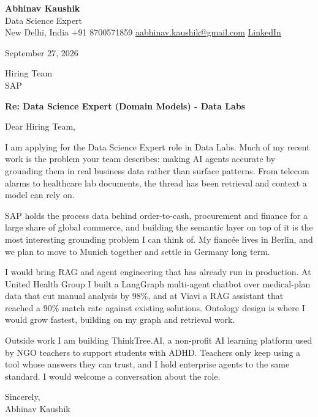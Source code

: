 \documentclass[11pt,a4paper]{article}
\begin{document}
{\Large\bfseries Abhinav Kaushik}\\
Data Science Expert\\
New Delhi, India \textbar{} +91 8700571859 \textbar{} \href{mailto:aabhinav.kaushik@gmail.com}{aabhinav.kaushik@gmail.com} \textbar{} \href{https://www.linkedin.com/in/abhinav-kaushik10/}{LinkedIn}  

September 27, 2026

Hiring Team\\
SAP

\textbf{Re: Data Science Expert (Domain Models) - Data Labs}

Dear Hiring Team,

I am applying for the Data Science Expert role in Data Labs. Much of my recent work is the problem your team describes: making AI agents accurate by grounding them in real business data rather than surface patterns. From telecom alarms to healthcare lab documents, the thread has been retrieval and context a model can rely on.

SAP holds the process data behind order-to-cash, procurement and finance for a large share of global commerce, and building the semantic layer on top of it is the most interesting grounding problem I can think of. My fiancée lives in Berlin, and we plan to move to Munich together and settle in Germany long term.

I would bring RAG and agent engineering that has already run in production. At United Health Group I built a LangGraph multi-agent chatbot over medical-plan data that cut manual analysis by 98\%, and at Viavi a RAG assistant that reached a 90\% match rate against existing solutions. Ontology design is where I would grow fastest, building on my graph and retrieval work.

Outside work I am building ThinkTree.AI, a non-profit AI learning platform used by NGO teachers to support students with ADHD. Teachers only keep using a tool whose answers they can trust, and I hold enterprise agents to the same standard. I would welcome a conversation about the role.

Sincerely,\\[4pt]
Abhinav Kaushik
\end{document}
